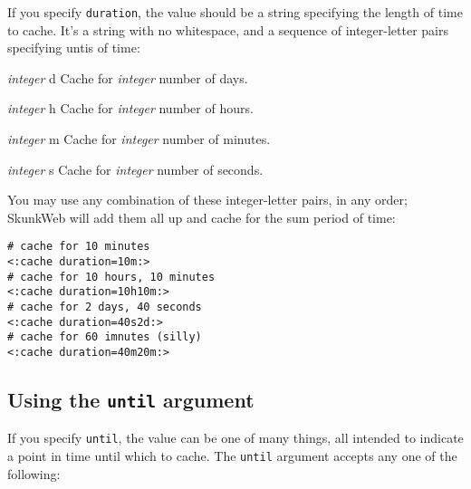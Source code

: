 \documentclass{manual}
\begin{document}
If you specify \texttt{duration}, the value should be 
a string specifying the length of time to cache. It's a 
string with no whitespace, and a sequence of integer-letter
pairs specifying untis of time:

\begin{argdesc}

\item[\emph{integer} d]
Cache for \emph{integer} number of days.
\item[\emph{integer} h]
Cache for \emph{integer} number of hours.
\item[\emph{integer} m]
Cache for \emph{integer} number of minutes.
\item[\emph{integer} s]
Cache for \emph{integer} number of seconds.
\end{argdesc}

You may use any combination of these integer-letter pairs,
in any order; SkunkWeb will add them all up and cache for the sum
period of time:

\begin{verbatim}
# cache for 10 minutes
<:cache duration=10m:>
# cache for 10 hours, 10 minutes
<:cache duration=10h10m:>
# cache for 2 days, 40 seconds
<:cache duration=40s2d:>
# cache for 60 imnutes (silly)
<:cache duration=40m20m:>
\end{verbatim}

\subsection{Using the \texttt{until} argument}

If you specify \texttt{until}, the value can be one
of many things, all intended to indicate a point in time
until which to cache. The \texttt{until} argument accepts
any one of the following:
\end{document}
